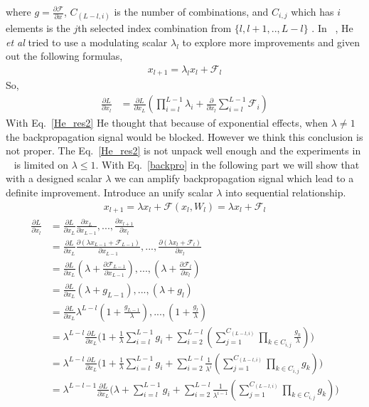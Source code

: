 \documentclass[]{article}
\begin{document}
where $g=\frac{\partial \mathcal{F}}{\partial x}$, $C_{(L-l,i)}$ is the number of combinations, and $C_{i,j}$ which has $i$ elements is the $j$th selected index combination from $\{l,l+1,.. ,L-l\}$ . In ~\cite{identity_mapping}, He \textit{et al} tried to use a modulating scalar $\lambda_{l}$ to explore more improvements and given out the following formulas,
\begin{align}\label{He_res1}
x_{l+1}=\lambda_{l}x_{l}+\mathcal{F}_{l}
\end{align}
So,
\begin{align}\label{He_res2}
\frac{\partial L}{\partial x_{l}}&=\frac{\partial L}{\partial x_{L}}(\prod_{i=l}^{L-1}\lambda_{i}+\frac{\partial}{\partial x_{l}}\sum_{i=l}^{L-1}\mathcal{F}_{i})
\end{align}
With Eq.~\ref{He_res2} He thought that because of exponential effects, when $\lambda \neq 1$ the backpropagation signal would be blocked. However we think this conclusion is not proper. The Eq.~\ref{He_res2} is not unpack well enough and the experiments in ~\cite{identity_mapping} is limited on $\lambda \leq 1$. With Eq.~\ref{backpro} in the following part we will show that with a designed scalar $\lambda$ we can amplify backpropagation signal which lead to a definite improvement. Introduce an unify scalar $\lambda$ into sequential relationship. 
\begin{align}\label{res_gradient}
x_{l+1}=\lambda x_{l}+\mathcal{F}(x_{l},W_{l})=\lambda x_{l}+\mathcal{F}_{l}
\end{align}
\begin{align}\label{amp_backpro}
\frac{\partial L}{\partial x_{l}}&=\frac{\partial L}{\partial x_{L}}\frac{\partial x_{L}}{\partial x_{L-1}}, ..., \frac{\partial x_{l+1}}{\partial x_{l}} \\
&=\frac{\partial L}{\partial x_{L}}\frac{ \partial(\lambda x_{L-1}+\mathcal{F}_{L-1})}{\partial x_{L-1}}, ..., \frac{ \partial(\lambda x_{l}+\mathcal{F}_{l})}{\partial x_{l}}  \\
&=\frac{\partial L}{\partial x_{L}}(\lambda+\frac{\partial \mathcal{F}_{L-1}}{\partial x_{L-1}}), ..., (\lambda+\frac{\partial \mathcal{F}_{l}}{\partial x_{l}})   \\
&=\frac{\partial L}{\partial x_{L}}(\lambda+g_{L-1}), ..., (\lambda+g_{l})   \\
&=\frac{\partial L}{\partial x_{L}}\lambda^{L-l}(1+\frac{g_{L-1}}{\lambda}), ..., (1+\frac{g_{l}}{\lambda})   \\
&=\lambda^{L-l}\frac{\partial L}{\partial x_{L}}\big(1+\frac{1}{\lambda}\sum_{i=l}^{L-1}g_{i}+\sum_{i=2}^{L-l}(\sum_{j=1}^{C_{(L-l,i)}}\prod_{k\in C_{i,j}} \frac{g_{k}}{\lambda})\big)   \\
&=\lambda^{L-l}\frac{\partial L}{\partial x_{L}}\big(1+\frac{1}{\lambda}\sum_{i=l}^{L-1}g_{i}+\sum_{i=2}^{L-l}\frac{1}{\lambda^{i}}(\sum_{j=1}^{C_{(L-l,i)}}\prod_{k\in C_{i,j}}g_{k})\big)   \\
&=\lambda^{L-l-1}\frac{\partial L}{\partial x_{L}}\big(\lambda+\sum_{i=l}^{L-1}g_{i}+\sum_{i=2}^{L-l}\frac{1}{\lambda^{i-1}}(\sum_{j=1}^{C_{(L-l,i)}}\prod_{k\in C_{i,j}}g_{k})\big)
\end{align}
\end{document}
